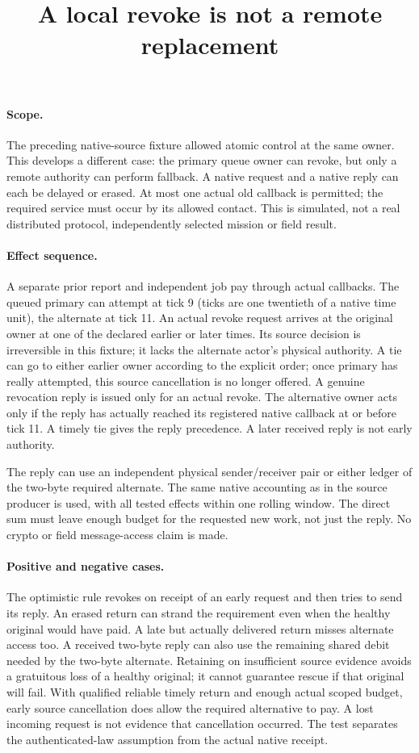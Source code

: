 \documentclass[11pt]{article}
\title{A local revoke is not a remote replacement}
\date{}
\begin{document}
\maketitle

\paragraph{Scope.}
The preceding native-source fixture allowed atomic control at the
same owner. This develops a different case: the primary queue owner
can revoke, but only a remote authority can perform fallback.
A native request and a native reply can each be delayed or erased.
At most one actual old callback is permitted; the required service
must occur by its allowed contact. This is simulated, not a real
distributed protocol, independently selected mission or field result.

\paragraph{Effect sequence.}
A separate prior report and independent job pay through actual
callbacks. The queued primary can attempt at tick 9 (ticks are
one twentieth of a native time unit), the alternate at tick 11.
An actual revoke request arrives at the original owner at one
of the declared earlier or later times. Its source decision is
irreversible in this fixture; it lacks the alternate actor's
physical authority. A tie can go to either earlier owner according
to the explicit order; once primary has really attempted, this
source cancellation is no longer offered. A genuine revocation
reply is issued only for an actual revoke. The alternative owner
acts only if the reply has actually reached its registered native
callback at or before tick 11. A timely tie gives the reply
precedence. A later received reply is not early authority.

The reply can use an independent physical sender/receiver pair or
either ledger of the two-byte required alternate. The same native
accounting as in the source producer is used, with all tested
effects within one rolling window. The direct sum must leave
enough budget for the requested new work, not just the reply.
No crypto or field message-access claim is made.

\paragraph{Positive and negative cases.}
The optimistic rule revokes on receipt of an early request and
then tries to send its reply. An erased return can strand the
requirement even when the healthy original would have paid.
A late but actually delivered return misses alternate access too.
A received two-byte reply can also use the remaining shared
debit needed by the two-byte alternate. Retaining on insufficient
source evidence avoids a gratuitous loss of a healthy original;
it cannot guarantee rescue if that original will fail. With
qualified reliable timely return and enough actual scoped budget,
early source cancellation does allow the required alternative
to pay. A lost incoming request is not evidence that cancellation
occurred. The test separates the authenticated-law assumption
from the actual native receipt.
\end{document}
